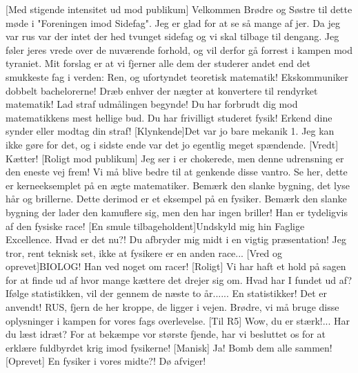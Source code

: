 \documentclass[a4paper,11pt]{article}
\begin{document}
\begin{sketch}
\scene{}
[Med stigende intensitet ud mod publikum] Velkommen Brødre og Søstre til dette møde i "Foreningen imod Sidefag". Jeg er glad for at se så mange af jer. 
Da jeg var rus var der intet der hed tvunget sidefag og vi skal tilbage til dengang. 
Jeg føler jeres vrede over de nuværende forhold, og vil derfor gå forrest i kampen mod tyraniet.
Mit forslag er at vi fjerner alle dem der studerer andet end det smukkeste fag i verden: Ren, og ufortyndet teoretisk matematik! Ekskommuniker dobbelt bachelorerne! Dræb enhver der nægter at konvertere til rendyrket matematik! 
 Lad straf udmålingen begynde!  Du har forbrudt dig mod matematikkens mest hellige bud. Du har frivilligt studeret fysik! Erkend dine synder eller modtag din straf!
[Klynkende]Det var jo bare mekanik 1. Jeg kan ikke gøre for det, og i sidste ende var det jo egentlig meget spændende.
[Vredt] Kætter! 
[Roligt mod publikum] Jeg ser i er chokerede, men denne udrensning er den eneste vej frem! Vi må blive bedre til at genkende disse vantro.  Se her, dette er kerneeksemplet på en ægte matematiker. Bemærk den slanke bygning, det lyse hår og brillerne.  Dette derimod  er et eksempel på en fysiker. Bemærk den slanke bygning der lader den kamuflere sig,  men den har ingen briller! Han er tydeligvis af den fysiske race! 
[En smule tilbageholdent]Undskyld mig hin Faglige Excellence. 
 Hvad er det nu?! Du afbryder mig midt i en vigtig præsentation!
 Jeg tror, rent teknisk set, ikke at fysikere er en anden race...
[Vred og oprevet]BIOLOG! Han ved noget om racer! 
[Roligt] Vi har haft et hold på sagen for at finde ud af hvor mange kættere det drejer sig om.  Hvad har I fundet ud af?
 Ifølge statistikken, vil der gennem de næste to år......
 En statistikker! Det er anvendt!
  RUS, fjern de her kroppe, de ligger i vejen. Brødre, vi må bruge disse oplysninger i kampen for vores fags overlevelse. 
[Til R5] Wow, du er stærk!... Har du læst idræt?
 For at bekæmpe vor største fjende, har vi besluttet os for at erklære fuldbyrdet krig imod fysikerne!
[Manisk] Ja! Bomb dem alle sammen!
[Oprevet] En fysiker i vores midte?! Dø afviger!  

\end{sketch}
\end{document}
